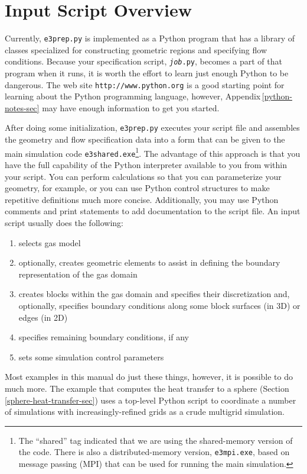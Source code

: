\documentclass[12pt,a4paper,twoside]{article}
\begin{document}
\section{Input Script Overview}
Currently, \texttt{e3prep.py} is implemented as 
a Python program that has a library of classes specialized for constructing
geometric regions and specifying flow conditions.
Because your specification script, \texttt{{\em job}.py}, 
becomes a part of that program when it runs,
it is worth the effort to learn just enough Python to be dangerous.
The web site \texttt{http://www.python.org} is a good starting point for
learning about the Python programming language, however, Appendix\,\ref{python-notes-sec}
may have enough information to get you started.

\medskip
After doing some initialization, \texttt{e3prep.py} executes your
script file and assembles the geometry and flow specification data
into a form that can be given to the main simulation code
\texttt{e3shared.exe}\footnote{The ``shared'' tag indicated that we are
  using the shared-memory version of the code.  
  There is also a distributed-memory version, \texttt{e3mpi.exe},
  based on message passing (MPI) that can be used for running the main simulation.
}.
The advantage of this approach is that you have the full capability of 
the Python interpreter available to you from within your script.
You can perform calculations so that you can parameterize your geometry, 
for example, or you can use Python control structures
to make repetitive definitions much more concise.
Additionally, you may use Python comments and print statements
to add documentation to the script file. 
An input script usually does the following:
\begin{enumerate}
  \item selects gas model
  \item optionally, creates geometric elements to assist in defining the boundary representation of the gas domain
  \item creates blocks within the gas domain and specifies their discretization and, optionally, 
        specifies boundary conditions along some block surfaces (in 3D) or edges (in 2D)
  \item specifies remaining boundary conditions, if any
  \item sets some simulation control parameters
\end{enumerate}
Most examples in this manual do just these things, however, it is possible to do much more.
The example that computes the heat transfer to a sphere (Section\,\ref{sphere-heat-transfer-sec}) uses a top-level Python
script to coordinate a number of simulations with increasingly-refined grids as a crude multigrid simulation.
\end{document}
